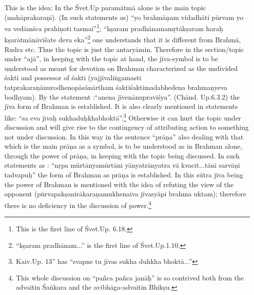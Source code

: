 This is the idea: In the Śvet.Up paramātmā alone is the main topic (mahāprakaraṇī). (In such statements as) “yo brahmāṇam vidadhāti pūrvam yo va vedāmśca prahiṇoti  tasmai”\footnote{This is the first line of Śvet.Up. 6.18.}; “kṣaram pradhānamamṛ\-tākṣaram haraḥ kṣarātmānāvīśate deva eka”\footnote{“kṣaram pradhānam...” is the first line of  Śvet.Up.1.10.} one understands that it is different from Brahmā, Rudra etc. Thus the topic is just the antaryāmin. Therefore in the section/topic under “ajā”, in keeping with the topic at hand, the jīva-symbol is to be understood as meant for devotion on Brahman characterized as the undivided śakti and possessor of śakti (yajjīvaliṅgamasti tatprakaraṇānurodhenopāsānārtham śaktiśaktimadabhedena brahmaṇyeva bodhyam). By the statement :\break “anena jīvenānupraviśya”. (Chānd. Up.6.3.2) the jīva form of Brahman is established. It is also clearly mentioned in statements like: “sa eva jīvaḥ sukhaduḥkhabhoktā”.\footnote{Kaiv.Up. 13” has “svapne tu jīvas sukha duhkha bhoktā...”} Otherwise it can hurt the topic under discussion and will give rise to the contingency of attributing action to something not under discussion.  In this way in the sentence “prāṇa” also dealing with that which is the main prāṇa as a symbol, is to be understood as in Brahman alone, through the power of prāṇa, in keeping with the topic being discussed. In such statements as : “nṛpa mūrtānyamūrtāni yānyatrānyatra vā kvacit...tāni sarvāṇi tadvapuḥ” the form of Brahman as prāṇa is established. In this sūtra jīva being the power of Brahman is mentioned with the idea of refuting the view of the opponent (pūrvapakṣanirākaraṇamukhenaiva jīvasyāpi brahma uktam); therefore there is no deficiency in the discussion of power.\footnote{This whole discussion on “pañca pañca janāḥ” is so contrived both from the advaitin Śaṅkara  and the avibhāga-advaitin Bhikṣu.}



